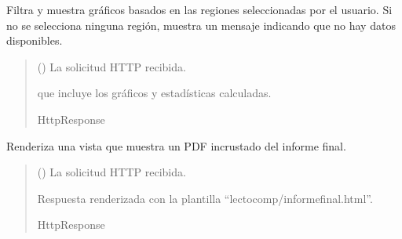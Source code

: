 \documentclass[letterpaper,10pt,spanish]{sphinxmanual}
\begin{document}
\begin{fulllineitems}

\pysigstartsignatures
{}
\pysigstopsignatures
\sphinxAtStartPar
Filtra y muestra gráficos basados en las regiones seleccionadas por el usuario.
Si no se selecciona ninguna región, muestra un mensaje indicando que no hay datos disponibles.
\begin{quote}\begin{description}
\sphinxAtStartPar
{} () \textendash{} La solicitud HTTP recibida.

\sphinxAtStartPar
\begin{description}
\sphinxAtStartPar
que incluye los gráficos y estadísticas calculadas.

\end{description}


\sphinxAtStartPar
HttpResponse

\end{description}\end{quote}

\end{fulllineitems}



\begin{fulllineitems}

\pysigstartsignatures
{}
\pysigstopsignatures
\sphinxAtStartPar
Renderiza una vista que muestra un PDF incrustado del informe final.
\begin{quote}\begin{description}
\sphinxAtStartPar
{} () \textendash{} La solicitud HTTP recibida.

\sphinxAtStartPar
Respuesta renderizada con la plantilla “lectocomp/informefinal.html”.

\sphinxAtStartPar
HttpResponse

\end{description}\end{quote}

\end{fulllineitems}
\end{document}
